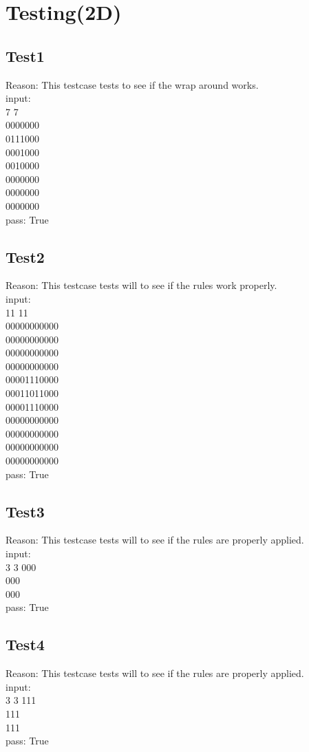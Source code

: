 \documentclass[a4paper, 10pt]{article}
\begin{document}
\section{Testing(2D)}
\subsection{Test1}
Reason: This testcase tests to see if the wrap around works.\\
input:\\
7 7\\
0000000\\
0111000\\
0001000\\
0010000\\
0000000\\
0000000\\
0000000\\
pass: True
\subsection{Test2}
Reason: This testcase tests will to see if the rules work properly.\\
input:\\
11 11\\
00000000000\\
00000000000\\
00000000000\\
00000000000\\
00001110000\\
00011011000\\
00001110000\\
00000000000\\
00000000000\\
00000000000\\
00000000000\\
pass: True
\subsection{Test3}
Reason: This testcase tests will to see if the rules are properly applied.\\
input:\\
3 3
000\\
000\\
000\\
pass: True
\subsection{Test4}
Reason: This testcase tests will to see if the rules are properly applied.\\
input:\\
3 3
111\\
111\\
111\\
pass: True
\end{document}
